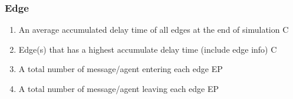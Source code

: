 \subsubsection*{Edge}
\begin{enumerate}
\item An average accumulated delay time of all edges at the end of simulation  C
\item Edge(s) that has a highest accumulate delay time (include edge info) C
\item A total number of message/agent entering each edge EP
\item A total number of message/agent leaving each edge EP
\end{enumerate}


